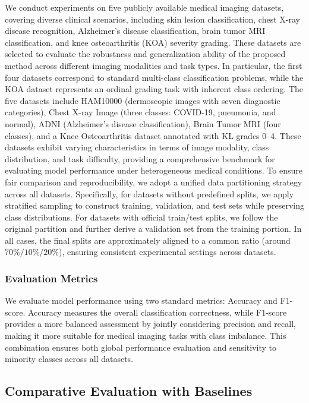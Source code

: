 \documentclass[letterpaper, 10 pt, conference]{ieeeconf}  %
\begin{document}
We conduct experiments on five publicly available medical imaging datasets, covering diverse clinical scenarios, including skin lesion classification, chest X-ray disease recognition, Alzheimer’s disease classification, brain tumor MRI classification, and knee osteoarthritis (KOA) severity grading. These datasets are selected to evaluate the robustness and generalization ability of the proposed method across different imaging modalities and task types. In particular, the first four datasets correspond to standard multi-class classification problems, while the KOA dataset represents an ordinal grading task with inherent class ordering. The five datasets include HAM10000 (dermoscopic images with seven diagnostic categories), Chest X-ray Image (three classes: COVID-19, pneumonia, and normal), ADNI (Alzheimer’s disease classification), Brain Tumor MRI (four classes), and a Knee Osteoarthritis dataset annotated with KL grades 0–4. These datasets exhibit varying characteristics in terms of image modality, class distribution, and task difficulty, providing a comprehensive benchmark for evaluating model performance under heterogeneous medical conditions. To ensure fair comparison and reproducibility, we adopt a unified data partitioning strategy across all datasets. Specifically, for datasets without predefined splits, we apply stratified sampling to construct training, validation, and test sets while preserving class distributions. For datasets with official train/test splits, we follow the original partition and further derive a validation set from the training portion. In all cases, the final splits are approximately aligned to a common ratio (around $70\%/10\%/20\%$), ensuring consistent experimental settings across datasets.


\subsubsection{Evaluation Metrics}

We evaluate model performance using two standard metrics: Accuracy and F1-score. Accuracy measures the overall classification correctness, while F1-score provides a more balanced assessment by jointly considering precision and recall, making it more suitable for medical imaging tasks with class imbalance. This combination ensures both global performance evaluation and sensitivity to minority classes across all datasets.

\subsection{Comparative Evaluation with Baselines}
\end{document}
